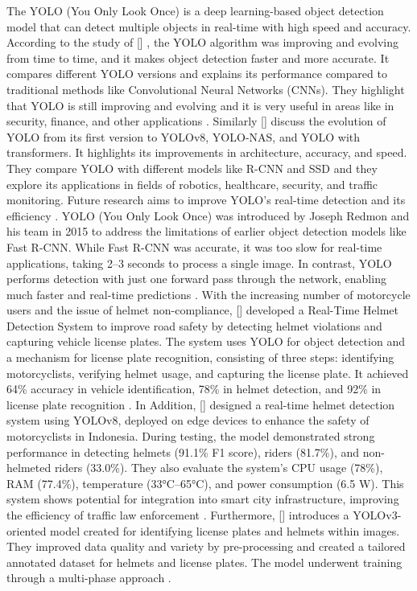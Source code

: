 \begin{refsection}
The YOLO (You Only Look Once) is a deep learning-based object detection model that can detect multiple objects in real-time with high speed and accuracy. According to the study of \citeauthor{jiang2022review} [\citeyear{jiang2022review}] , the YOLO algorithm was improving and evolving from time to time, and it makes object detection faster and more accurate. It compares different YOLO versions and explains its performance compared to traditional methods like Convolutional Neural Networks (CNNs). They highlight that YOLO is still improving and evolving and it is very useful in areas like in security, finance, and other applications \cite{jiang2022review}. Similarly \citeauthor{terven2022comprehensive} [\citeyear{terven2022comprehensive}] discuss the evolution of YOLO from its first version to YOLOv8, YOLO-NAS, and YOLO with transformers. It highlights its improvements in architecture, accuracy, and speed. They compare YOLO with different models like R-CNN and SSD and they explore its applications in fields of robotics, healthcare, security, and traffic monitoring. Future research aims to improve YOLO’s real-time detection and its efficiency \cite{terven2022comprehensive}. YOLO (You Only Look Once) was introduced by Joseph Redmon and his team in 2015 to address the limitations of earlier object detection models like Fast R-CNN. While Fast R-CNN was accurate, it was too slow for real-time applications, taking 2–3 seconds to process a single image. In contrast, YOLO performs detection with just one forward pass through the network, enabling much faster and real-time predictions \cite{gfg2021yolo}.
With the increasing number of motorcycle users and the issue of helmet non-compliance, \citeauthor{kumar2024realtime}[\citeyear{kumar2024realtime}] developed a Real-Time Helmet Detection System to improve road safety by detecting helmet violations and capturing vehicle license plates. The system uses YOLO for object detection and a mechanism for license plate recognition, consisting of three steps: identifying motorcyclists, verifying helmet usage, and capturing the license plate. It achieved 64\% accuracy in vehicle identification, 78\% in helmet detection, and 92\% in license plate recognition \cite{kumar2024realtime}. In Addition, \citeauthor{muhammad2024helmet} [\citeyear{muhammad2024helmet}] designed a real-time helmet detection system using YOLOv8, deployed on edge devices to enhance the safety of motorcyclists in Indonesia. During testing, the model demonstrated strong performance in detecting helmets (91.1\% F1 score), riders (81.7\%), and non-helmeted riders (33.0\%). They also evaluate the system’s CPU usage (78\%), RAM (77.4\%), temperature (33°C–65°C), and power consumption (6.5 W). This system shows potential for integration into smart city infrastructure, improving the efficiency of traffic law enforcement \cite {muhammad2024helmet}. Furthermore,\citeauthor{choubey2025helmet} [\citeyear{choubey2025helmet}] introduces a YOLOv3-oriented model created for identifying license plates and helmets within images. They improved data quality and variety by pre-processing and created a tailored annotated dataset for helmets and license plates. The model underwent training through a multi-phase approach \cite{choubey2025helmet}.


\end{refsection}
